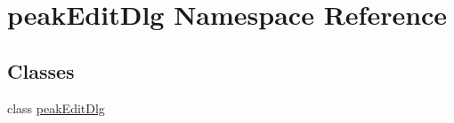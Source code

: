 \hypertarget{namespacepeak_edit_dlg}{\section{peak\-Edit\-Dlg Namespace Reference}
\label{namespacepeak_edit_dlg}
}
\subsection*{Classes}
\begin{DoxyCompactItemize}
\item 
class \hyperlink{classpeak_edit_dlg_1_1peak_edit_dlg}{peak\-Edit\-Dlg}
\end{DoxyCompactItemize}
